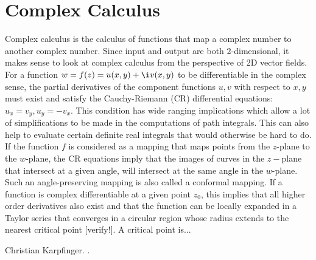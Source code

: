 \documentclass[12pt]{article}
\begin{document}
\section{Complex Calculus}
Complex calculus is the calculus of functions that map a complex number to another complex number. Since input and output are both 2-dimensional, it makes sense to look at complex calculus from the perspective of 2D vector fields. For a function $w = f(z) = u(x,y) + \i v(x,y)$ to be differentiable in the complex sense, the partial derivatives of the component functions $u,v$ with respect to $x,y$ must exist and satisfy the Cauchy-Riemann (CR) differential equations: $u_x = v_y, u_y = -v_x$. This condition has wide ranging implications which allow a lot of simplifications to be made in the computations of path integrals. This can also help to evaluate certain definite real integrals that would otherwise be hard to do. If the function $f$ is considered as a mapping that maps points from the $z$-plane to the $w$-plane, the CR equations imply that the images of curves in the $z-$plane that intersect at a given angle, will intersect at the same angle in the $w$-plane. Such an angle-preserving mapping is also called a conformal mapping. If a function is complex differentiable at a given point $z_0$, this implies that all higher order derivatives also exist and that the function can be locally expanded in a Taylor series that converges in a circular region whose radius extends to the nearest critical point [verify!]. A critical point is...




\begin{thebibliography}{10}
Christian Karpfinger. .
\end{thebibliography}	

 
  
	
\end{document}
